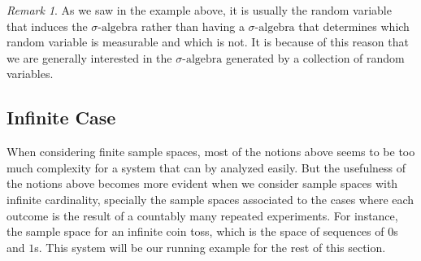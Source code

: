 \documentclass[11pt,a4paper]{article}
\theoremstyle{definition}
\theoremstyle{remark}
\newtheorem{remark}{Remark}
\begin{document}
	
	\begin{remark}
		As we saw in the example above, it is usually the random variable that induces the $\sigma\text{-algebra}$ rather than having a $\sigma\text{-algebra}$ that determines which random variable is measurable and which is not. It is because of this reason that we are generally interested in the $\sigma\text{-algebra}$ generated by a collection of random variables.
	\end{remark}
	
	
	\subsection{Infinite Case}
	
	When considering finite sample spaces, most of the notions above seems to be too much complexity for a system that can by analyzed easily. But the usefulness of the notions above becomes more evident when we consider sample spaces with infinite cardinality, specially the sample spaces associated to the cases where each outcome is the result of a countably many repeated experiments. For instance, the sample space for an infinite coin toss, which is the space of sequences of $ 0 $s and $ 1 $s. This system will be our running example for the rest of this section.
	
\end{document}

